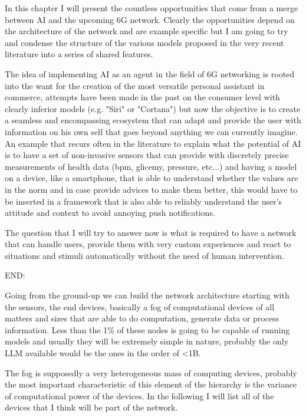 

In this chapter I will present the countless opportunities that come from a merge between AI and the
upcoming 6G network. Clearly the opportunities depend on the architecture of the network and are
example specific but I am going to try and condense the structure of the various models proposed in the very recent literature into a series of shared features.

The idea of implementing AI as an agent in the field of 6G networking is rooted into the want for
the creation of the most versatile personal assistant in commerce, attempts have been made in the
past on the consumer level with clearly inferior models (e.g. "Siri" or "Cortana") but now the
objective is to create a seamless and encompassing ecosystem that can adapt and provide the user
with information on his own self that goes beyond anything we can currently imagine. An example that
recurs often in the literature to explain what the potential of AI is to have a set of non-invasive sensors that can provide with discretely precise measurements of health data (bpm,
glicemy, pressure, etc...) and having a model on a device, like a smartphone, that is able to understand
whether the values are in the norm and in case provide advices to make them better, this would have
to be inserted in a framework that is also able to reliably understand the user's attitude and
context to avoid annoying push notifications.

The question that I will try to answer now is what is required to have a network that can handle
users, provide them with very custom experiences and react to situations and stimuli automatically
without the need of human intervention.

\bigskip
\noindent
END:
\label{ssec:end}

Going from the ground-up we can build the network architecture starting with the sensors, the end
devices, basically a fog of computational devices of all matters and sizes that are able to do
computation, generate data or process information. Less than the 1\% of these nodes is going to be
capable of running models and usually they will be extremely simple in nature, probably the only LLM
available would be the ones in the order of <1B.

The fog is supposedly a very heterogeneous mass of computing devices, probably the most important
characteristic of this element of the hierarchy is the variance of computational power of the
devices. In the following I will list all of the devices that I think will be part of the network.

